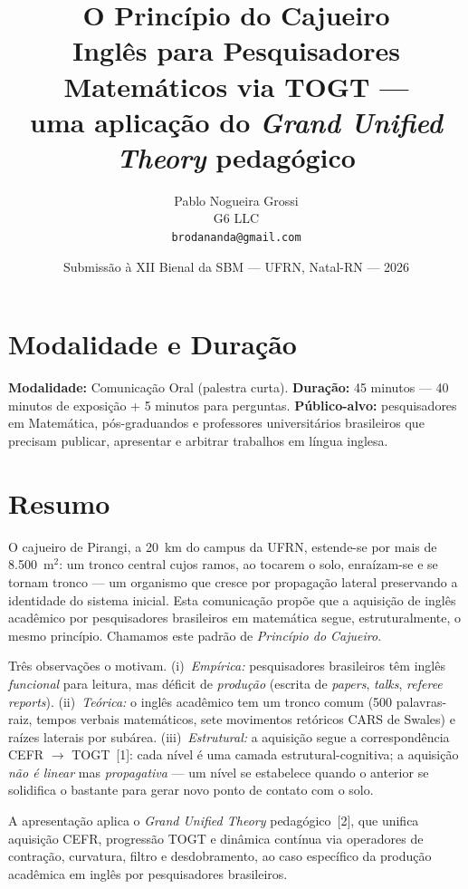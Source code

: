 \documentclass[11pt,a4paper]{article}
\title{\textbf{O Princípio do Cajueiro}\\[0.3em]
\large Inglês para Pesquisadores Matemáticos via TOGT ---\\
uma aplicação do \emph{Grand Unified Theory} pedagógico}
\author{Pablo Nogueira Grossi\\
\small G6 LLC\\
\small \texttt{brodananda@gmail.com}}
\date{Submissão à XII Bienal da SBM --- UFRN, Natal-RN --- 2026}
\begin{document}
\maketitle

\section*{Modalidade e Duração}
\noindent
\textbf{Modalidade:} Comunicação Oral (palestra curta).\quad
\textbf{Duração:} 45 minutos --- 40 minutos de exposição + 5 minutos para perguntas.\quad
\textbf{Público-alvo:} pesquisadores em Matemática, pós-graduandos e professores universitários brasileiros que precisam publicar, apresentar e arbitrar trabalhos em língua inglesa.

\section*{Resumo}

O cajueiro de Pirangi, a 20~km do campus da UFRN, estende-se por mais de 8.500~m$^2$: um tronco central cujos ramos, ao tocarem o solo, enraízam-se e se tornam tronco --- um organismo que cresce por propagação lateral preservando a identidade do sistema inicial. Esta comunicação propõe que a aquisição de inglês acadêmico por pesquisadores brasileiros em matemática segue, estruturalmente, o mesmo princípio. Chamamos este padrão de \emph{Princípio do Cajueiro}.

Três observações o motivam. (i)~\emph{Empírica:} pesquisadores brasileiros têm inglês \emph{funcional} para leitura, mas déficit de \emph{produção} (escrita de \emph{papers}, \emph{talks}, \emph{referee reports}). (ii)~\emph{Teórica:} o inglês acadêmico tem um tronco comum (500 palavras-raiz, tempos verbais matemáticos, sete movimentos retóricos CARS de Swales) e raízes laterais por subárea. (iii)~\emph{Estrutural:} a aquisição segue a correspondência CEFR $\to$ TOGT~[1]: cada nível é uma camada estrutural-cognitiva; a aquisição \emph{não é linear} mas \emph{propagativa} --- um nível se estabelece quando o anterior se solidifica o bastante para gerar novo ponto de contato com o solo.

A apresentação aplica o \emph{Grand Unified Theory} pedagógico~[2], que unifica aquisição CEFR, progressão TOGT e dinâmica contínua via operadores de contração, curvatura, filtro e desdobramento, ao caso específico da produção acadêmica em inglês por pesquisadores brasileiros.
\end{document}

